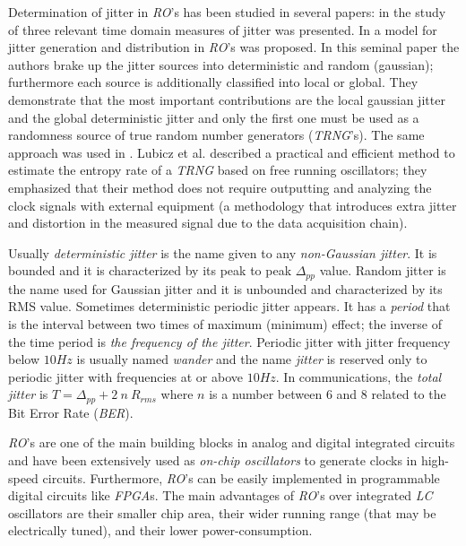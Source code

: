 Determination of jitter in \emph{RO}'s has been studied in several papers: in \cite{McNeill1997} the study of three relevant time domain measures of jitter was presented. In \cite{Valtchanov2008} a model for jitter generation and distribution in \emph{RO}'s was proposed. In this seminal paper the authors brake up the jitter sources into deterministic and random (gaussian); furthermore each source is additionally classified into local or global. They demonstrate that the most important contributions are the local gaussian jitter and the global deterministic jitter and only the first one must be used as a randomness source of true random number generators (\emph{TRNG}'s). The same approach was used in \cite{Fischer2008,Valtchanov2010,Baudet2011,Jessa2011}. Lubicz et al. described a practical and efficient method to estimate the entropy rate of a \emph{TRNG} based on free running oscillators; they emphasized that their method does not require outputting and analyzing the clock signals with external equipment \cite{Lubicz2014} (a methodology that introduces extra jitter and distortion in the measured signal due to the data acquisition chain). 

Usually \emph{deterministic jitter} is the name given to any \emph{non-Gaussian jitter}. It is bounded and it is characterized by its peak to peak $\Delta_{pp}$ value. Random jitter is the name used for Gaussian jitter and it is unbounded and characterized by its RMS value. Sometimes deterministic periodic jitter appears. It has a \emph{period} that is the interval between two times of maximum (minimum) effect; the inverse of the time period is \emph{the frequency of the jitter}. Periodic jitter with jitter frequency below $10 Hz$ is usually named \emph{wander} and the name \emph{jitter} is reserved only to periodic jitter with frequencies at or above $10 Hz$. In communications, the \emph{total jitter} is $T = \Delta_{pp} + 2~n~R_{rms}$ where $n$ is a number between $6$ and $8$ related to the Bit Error Rate (\emph{BER}). 

\emph{RO}'s are one of the main building blocks in analog and digital integrated circuits and have been extensively used as \emph{on-chip oscillators} to generate clocks in high-speed circuits. Furthermore, \emph{RO}'s can be easily implemented in programmable digital circuits like \emph{FPGA}s. The main advantages of \emph{RO}'s over integrated \emph{LC} oscillators are their smaller chip area, their wider running range (that may be electrically tuned), and their lower power-consumption. 
 
